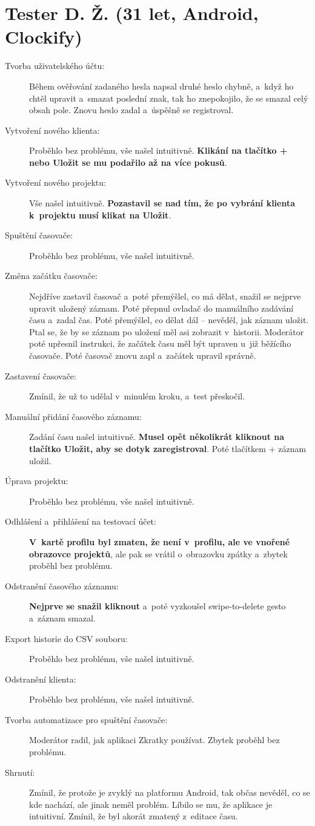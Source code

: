 \section*{Tester D. Ž. (31 let, Android, Clockify)}

\begin{description}
\item[Tvorba uživatelského účtu:] Během ověřování zadaného hesla napsal druhé heslo chybně, a~když ho chtěl upravit a~smazat poslední znak, tak ho znepokojilo, že se smazal celý obsah pole. Znovu heslo zadal a~úspěšně se registroval.
\item[Vytvoření nového klienta:] Proběhlo bez problému, vše našel intuitivně. \textbf{Klikání na tlačítko + nebo Uložit se mu podařilo až na více pokusů}.
\item[Vytvoření nového projektu:] Vše našel intuitivně. \textbf{Pozastavil se nad tím, že po vybrání klienta k~projektu musí klikat na Uložit}.
\item[Spuštění časovače:] Proběhlo bez problému, vše našel intuitivně.
\item[Změna začátku časovače:] Nejdříve zastavil časovač a~poté přemýšlel, co má dělat, snažil se nejprve upravit uložený záznam. Poté přepnul ovladač do manuálního zadávání času a~zadal čas. Poté přemýšlel, co dělat dál – nevěděl, jak záznam uložit. Ptal se, že by se záznam po uložení měl asi zobrazit v~historii. Moderátor poté upřesnil instrukci, že začátek času měl být upraven u~již běžícího časovače. Poté časovač znovu zapl a~začátek upravil správně.
\item[Zastavení časovače:] Zmínil, že už to udělal v~minulém kroku, a~test přeskočil.
\item[Manuální přidání časového záznamu:] Zadání času našel intuitivně. \textbf{Musel opět několikrát kliknout na tlačítko Uložit, aby se dotyk zaregistroval}. Poté tlačítkem + záznam uložil.
\item[Úprava projektu:] Proběhlo bez problému, vše našel intuitivně.
\item[Odhlášení a~přihlášení na testovací účet:] \textbf{V~kartě profilu byl zmaten, že není v~profilu, ale ve vnořené obrazovce projektů}, ale pak se vrátil o~obrazovku zpátky a~zbytek proběhl bez problému.
\item[Odstranění časového záznamu:] \textbf{Nejprve se snažil kliknout} a~poté vyzkoušel swipe-to-delete gesto a~záznam smazal.
\item[Export historie do CSV souboru:] Proběhlo bez problému, vše našel intuitivně.
\item[Odstranění klienta:] Proběhlo bez problému, vše našel intuitivně.
\item[Tvorba automatizace pro spuštění časovače:] Moderátor radil, jak aplikaci Zkratky používat. Zbytek proběhl bez problému.
\item[Shrnutí:] Zmínil, že protože je zvyklý na platformu Android, tak občas nevěděl, co se kde nachází, ale jinak neměl problém. Líbilo se mu, že aplikace je intuitivní. Zmínil, že byl akorát zmatený z~editace času. 
\end{description}

